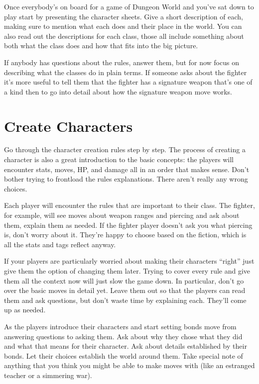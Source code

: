  Once everybody's on board for a game of Dungeon World and you've sat down to play start by presenting the character sheets. Give a short description of each, making sure to mention what each does and their place in the world. You can also read out the descriptions for each class, those all include something about both what the class does and how that fits into the big picture.


 If anybody has questions about the rules, answer them, but for now focus on describing what the classes do in plain terms. If someone asks about the fighter it's more useful to tell them that the fighter has a signature weapon that's one of a kind then to go into detail about how the signature weapon move works.
\section*{Create Characters}


 Go through the character creation rules step by step. The process of creating a character is also a great introduction to the basic concepts: the players will encounter stats, moves, HP, and damage all in an order that makes sense. Don't bother trying to frontload the rules explanations. There aren't really any wrong choices.


 Each player will encounter the rules that are important to their class. The fighter, for example, will see moves about weapon ranges and piercing and ask about them, explain them as needed. If the fighter player doesn't ask you what piercing is, don't worry about it. They're happy to choose based on the fiction, which is all the stats and tags reflect anyway.


 If your players are particularly worried about making their characters ``right'' just give them the option of changing them later. Trying to cover every rule and give them all the context now will just slow the game down. In particular, don't go over the basic moves in detail yet. Leave them out so that the players can read them and ask questions, but don't waste time by explaining each. They'll come up as needed.


 As the players introduce their characters and start setting bonds move from answering questions to asking them. Ask about why they chose what they did and what that means for their character. Ask about details established by their bonds. Let their choices establish the world around them. Take special note of anything that you think you might be able to make moves with (like an estranged teacher or a simmering war).
